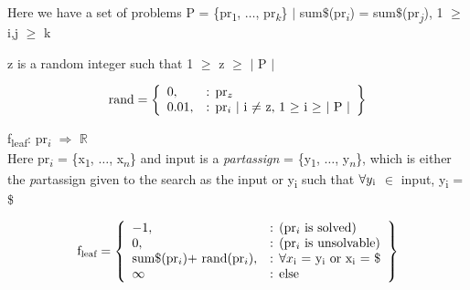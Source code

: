 \documentclass[11pt, oneside]{article}   	%
\begin{document}
\noindent Here we have a set of problems P =  \{pr\textsubscript{1}, $\dots$, pr\textsubscript{$k$}\} $\vert$ sum$\$$(pr\textsubscript{$i$}) = sum$\$$(pr\textsubscript{$j$}), 1 $\geq$ i,j $\geq$ k

\noindent z is a random integer such that 1 $\geq$ z $\geq$ $\vert$ P $\vert$

    \[
        \text{rand} = \left\{\begin{array}{ll}
            0, & \text{: pr\textsubscript{$z$}}\\
            0.01, & \text{: pr\textsubscript{$i$} $\vert$ i $\neq$ z, 1 $\geq$ i $\geq$ $\vert$ P $\vert$}\\
            \end{array}\right\}
      \]

\noindent f\textsubscript{leaf}: pr\textsubscript{$i$} $\Rightarrow$ $\mathbb{R}$\\

\noindent Here  pr\textsubscript{$i$} = \{x\textsubscript{1}, $\dots$, x\textsubscript{$n$}\} and input is a \textit {partassign} = \{y\textsubscript{1}, $\dots$, y\textsubscript{$n$}\}, which is either the \textit partassign given to the search as the input or y\textsubscript{i} such that $\forall y\textsubscript{i}$ $\in$ input, y\textsubscript{i} = \$

    \[
        \text{f\textsubscript{leaf}} = \left\{\begin{array}{ll}
            -1, & \text{: (pr\textsubscript{$i$} is solved)}\\
            0, & \text{: (pr\textsubscript{$i$} is unsolvable)}\\
            \text{sum$\$$(pr\textsubscript{$i$})+ rand(pr\textsubscript{$i$})}, & \text{: $\forall x\textsubscript{i}$ = y\textsubscript{i} or x\textsubscript{i} = \$}\\
	\infty & \text{: else}
            \end{array}\right\}
      \]
\end{document}

